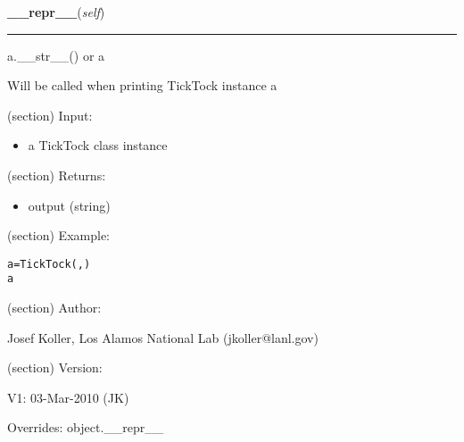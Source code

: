 \hspace{.8\funcindent}\begin{boxedminipage}{\funcwidth}

    \raggedright \textbf{\_\_repr\_\_}(\textit{self})

    \vspace{-1.5ex}

    \rule{\textwidth}{0.5\fboxrule}
\setlength{\parskip}{2ex}
    a.\_\_str\_\_() or a

    Will be called when printing TickTock instance a

    (section) Input:

      \begin{itemize}
      \setlength{\parskip}{0.6ex}
        \item a TickTock class instance

      \end{itemize}

    (section) Returns:

      \begin{itemize}
      \setlength{\parskip}{0.6ex}
        \item output (string)

      \end{itemize}

    (section) Example:

\begin{alltt}
\pysrcprompt{{\textgreater}{\textgreater}{\textgreater} }a = TickTock(, )
\pysrcprompt{{\textgreater}{\textgreater}{\textgreater} }a
\end{alltt}
    (section) Author:

      Josef Koller, Los Alamos National Lab (jkoller@lanl.gov)

    (section) Version:

      V1: 03-Mar-2010 (JK)

\setlength{\parskip}{1ex}
      Overrides: object.\_\_repr\_\_

    \end{boxedminipage}

    \label{spacepy:spacetime:TickTock:__getstate__}

    \vspace{0.5ex}

